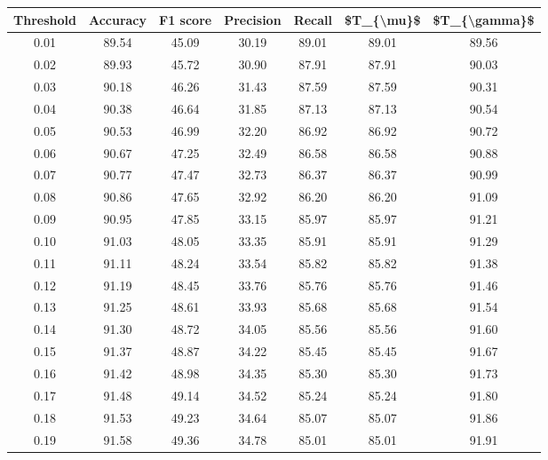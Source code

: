 \begin{tabular}{|c|c|c|c|c|c|c|}
\hline
 Threshold &  Accuracy &  F1 score &  Precision &  Recall &  \$T\_\{\textbackslash mu\}\$ &  \$T\_\{\textbackslash gamma\}\$ \\
\hline
      0.01 &     89.54 &     45.09 &      30.19 &   89.01 &      89.01 &         89.56 \\
      0.02 &     89.93 &     45.72 &      30.90 &   87.91 &      87.91 &         90.03 \\
      0.03 &     90.18 &     46.26 &      31.43 &   87.59 &      87.59 &         90.31 \\
      0.04 &     90.38 &     46.64 &      31.85 &   87.13 &      87.13 &         90.54 \\
      0.05 &     90.53 &     46.99 &      32.20 &   86.92 &      86.92 &         90.72 \\
      0.06 &     90.67 &     47.25 &      32.49 &   86.58 &      86.58 &         90.88 \\
      0.07 &     90.77 &     47.47 &      32.73 &   86.37 &      86.37 &         90.99 \\
      0.08 &     90.86 &     47.65 &      32.92 &   86.20 &      86.20 &         91.09 \\
      0.09 &     90.95 &     47.85 &      33.15 &   85.97 &      85.97 &         91.21 \\
      0.10 &     91.03 &     48.05 &      33.35 &   85.91 &      85.91 &         91.29 \\
      0.11 &     91.11 &     48.24 &      33.54 &   85.82 &      85.82 &         91.38 \\
      0.12 &     91.19 &     48.45 &      33.76 &   85.76 &      85.76 &         91.46 \\
      0.13 &     91.25 &     48.61 &      33.93 &   85.68 &      85.68 &         91.54 \\
      0.14 &     91.30 &     48.72 &      34.05 &   85.56 &      85.56 &         91.60 \\
      0.15 &     91.37 &     48.87 &      34.22 &   85.45 &      85.45 &         91.67 \\
      0.16 &     91.42 &     48.98 &      34.35 &   85.30 &      85.30 &         91.73 \\
      0.17 &     91.48 &     49.14 &      34.52 &   85.24 &      85.24 &         91.80 \\
      0.18 &     91.53 &     49.23 &      34.64 &   85.07 &      85.07 &         91.86 \\
      0.19 &     91.58 &     49.36 &      34.78 &   85.01 &      85.01 &         91.91 \\

\end{tabular}
